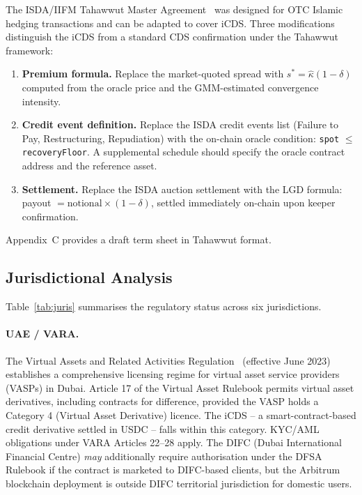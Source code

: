 \documentclass[12pt]{article}
\theoremstyle{plain}
\theoremstyle{definition}
\theoremstyle{remark}
\begin{document}
The ISDA/IIFM Tahawwut Master Agreement~\cite{IIFM2010} was designed for
OTC Islamic hedging transactions and can be adapted to cover iCDS.
Three modifications distinguish the iCDS from a standard CDS confirmation
under the Tahawwut framework:

\begin{enumerate}
  \item \textbf{Premium formula.} Replace the market-quoted spread with
    $s^* = \hat{\kappa}(1-\delta)$ computed from the oracle price
    and the GMM-estimated convergence intensity.
  \item \textbf{Credit event definition.} Replace the ISDA credit events list
    (Failure to Pay, Restructuring, Repudiation) with the on-chain oracle
    condition: \texttt{spot} $\leq$ \texttt{recoveryFloor}.
    A supplemental schedule should specify the oracle contract address and
    the reference asset.
  \item \textbf{Settlement.} Replace the ISDA auction settlement with the
    LGD formula: payout $= \text{notional} \times (1 - \delta)$, settled
    immediately on-chain upon keeper confirmation.
\end{enumerate}

Appendix~C provides a draft term sheet in Tahawwut format.

\subsection{Jurisdictional Analysis}

Table~\ref{tab:juris} summarises the regulatory status across six
jurisdictions.



\paragraph{UAE / VARA.}
The Virtual Assets and Related Activities Regulation~\cite{VARA2023}
(effective June 2023) establishes a comprehensive licensing regime for virtual
asset service providers (VASPs) in Dubai.
Article 17 of the Virtual Asset Rulebook permits virtual asset derivatives,
including contracts for difference, provided the VASP holds a Category 4
(Virtual Asset Derivative) licence.
The iCDS -- a smart-contract-based credit derivative settled in USDC --
falls within this category.
KYC/AML obligations under VARA Articles 22--28 apply.
The DIFC (Dubai International Financial Centre) \emph{may} additionally
require authorisation under the DFSA Rulebook if the contract is marketed to
DIFC-based clients, but the Arbitrum blockchain deployment is outside DIFC
territorial jurisdiction for domestic users.
\end{document}
